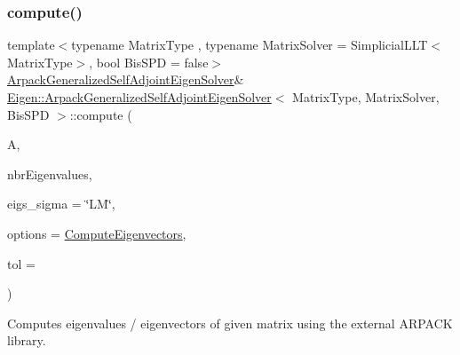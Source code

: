 \mbox{\label{class_eigen_1_1_arpack_generalized_self_adjoint_eigen_solver_a0e928eafffe83fba9be215b74e7105b7}} 
\subsubsection{\texorpdfstring{compute()}{compute()}\hspace{0.1cm}{\footnotesize\ttfamily [4/4]}}
{\footnotesize\ttfamily template$<$typename Matrix\+Type , typename Matrix\+Solver  = Simplicial\+L\+L\+T$<$\+Matrix\+Type$>$, bool Bis\+S\+PD = false$>$ \\
\hyperlink{class_eigen_1_1_arpack_generalized_self_adjoint_eigen_solver}{Arpack\+Generalized\+Self\+Adjoint\+Eigen\+Solver}\& \hyperlink{class_eigen_1_1_arpack_generalized_self_adjoint_eigen_solver}{Eigen\+::\+Arpack\+Generalized\+Self\+Adjoint\+Eigen\+Solver}$<$ Matrix\+Type, Matrix\+Solver, Bis\+S\+PD $>$\+::compute (\begin{DoxyParamCaption}\item[{const Matrix\+Type \&}]{A,  }\item[{Index}]{nbr\+Eigenvalues,  }\item[{std\+::string}]{eigs\+\_\+sigma = {\ttfamily \char`\"{}LM\char`\"{}},  }\item[{int}]{options = {\ttfamily \hyperlink{group__enums_ggae3e239fb70022eb8747994cf5d68b4a9ada93d8885bde32b876ba4af01d3292cc}{Compute\+Eigenvectors}},  }\item[{\hyperlink{class_eigen_1_1_arpack_generalized_self_adjoint_eigen_solver_a2555af55e53bf9de894a49e639be2e1e}{Real\+Scalar}}]{tol = {} }\end{DoxyParamCaption})}



Computes eigenvalues / eigenvectors of given matrix using the external A\+R\+P\+A\+CK library. 



